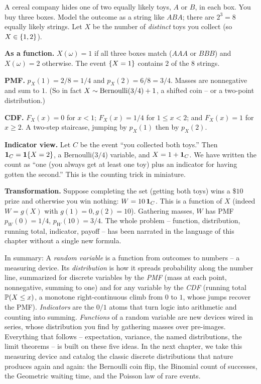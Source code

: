 \begin{example}
\label{ch06:ex-coupons}
A cereal company hides one of two equally likely toys, $A$ or $B$, in each box. You buy
three boxes. Model the outcome as a string like $ABA$; there are $2^3 = 8$ equally
likely strings. Let $X$ be the number of \emph{distinct} toys you collect (so
$X \in \set{1,2}$).

\textbf{As a function.} $X(\omega) = 1$ if all three boxes match ($AAA$ or $BBB$) and
$X(\omega) = 2$ otherwise. The event $\set{X = 1}$ contains $2$ of the $8$ strings.

\textbf{PMF.} $p_X(1) = 2/8 = 1/4$ and $p_X(2) = 6/8 = 3/4$. Masses are nonnegative and
sum to $1$. (So in fact $X \sim \Bern(3/4) + 1$, a shifted coin -- or a two-point
distribution.)

\textbf{CDF.} $F_X(x) = 0$ for $x < 1$; $F_X(x) = 1/4$ for $1 \le x < 2$; and
$F_X(x) = 1$ for $x \ge 2$. A two-step staircase, jumping by $p_X(1)$ then by $p_X(2)$.

\textbf{Indicator view.} Let $C$ be the event ``you collected both toys.'' Then
$\ind_C = \ind\set{X = 2}$, a Bernoulli($3/4$) variable, and $X = 1 + \ind_C$. We have
written the count as ``one (you always get at least one toy) plus an indicator for
having gotten the second.'' This is the counting trick in miniature.

\textbf{Transformation.} Suppose completing the set (getting both toys) wins a \$$10$
prize and otherwise you win nothing: $W = 10\,\ind_C$. This is a function of $X$ (indeed
$W = g(X)$ with $g(1) = 0, g(2) = 10$). Gathering masses, $W$ has PMF
$p_W(0) = 1/4$, $p_W(10) = 3/4$. The whole problem -- function, distribution, running
total, indicator, payoff -- has been narrated in the language of this chapter without a
single new formula.
\end{example}

\begin{recoverybox}
In summary: A \emph{random variable} is a function from
outcomes to numbers -- a measuring device. Its \emph{distribution} is how it spreads
probability along the number line, summarized for discrete variables by the \emph{PMF}
(mass at each point, nonnegative, summing to one) and for any variable by the
\emph{CDF} (running total $\P(X \le x)$, a monotone right-continuous climb from $0$ to
$1$, whose jumps recover the PMF). \emph{Indicators} are the $0/1$ atoms that turn logic
into arithmetic and counting into summing. \emph{Functions} of a random variable are
new devices wired in series, whose distribution you find by gathering masses over
pre-images. Everything that follows -- expectation, variance, the named distributions,
the limit theorems -- is built on these five ideas. In the next chapter, we take this
measuring device and catalog the classic discrete distributions that nature produces again
and again: the Bernoulli coin flip, the Binomial count of successes, the Geometric waiting
time, and the Poisson law of rare events.
\end{recoverybox}

